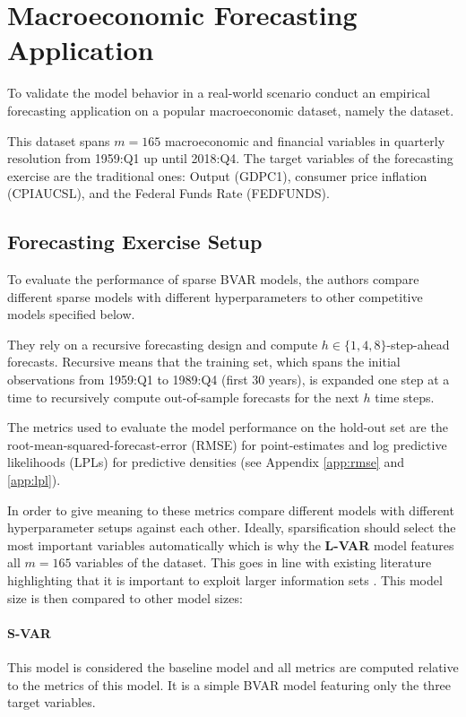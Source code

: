 \section{Macroeconomic Forecasting Application}
\label{sec:forecasting_application}
To validate the model behavior in a real-world scenario \textcite{hauzenberger_combining_2021} conduct an empirical forecasting application on a popular macroeconomic dataset, namely the \textcite{mccracken_fred-md_2015} dataset.

This dataset spans $m = 165$ macroeconomic and financial variables in quarterly resolution from 1959:Q1 up until 2018:Q4. The target variables of the forecasting exercise are the traditional ones: Output (GDPC1), consumer price inflation (CPIAUCSL), and the Federal Funds Rate (FEDFUNDS).

\subsection{Forecasting Exercise Setup}
\label{subsec:forecasting_setup}
To evaluate the performance of sparse BVAR models, the authors compare different sparse models with different hyperparameters to other competitive models specified below.

They rely on a recursive forecasting design and compute $h \in \{1,4,8\}$-step-ahead forecasts. Recursive means that the training set, which spans the initial observations from 1959:Q1 to 1989:Q4 (first 30 years), is expanded one step at a time to recursively compute out-of-sample forecasts for the next $h$ time steps.

The metrics used to evaluate the model performance on the hold-out set are the root-mean-squared-forecast-error (RMSE) for point-estimates and log predictive likelihoods (LPLs) for predictive densities (see Appendix \ref{app:rmse} and \ref{app:lpl}).

In order to give meaning to these metrics \textcite{hauzenberger_combining_2021} compare different models with different hyperparameter setups against each other. Ideally, sparsification should select the most important variables automatically which is why the \textbf{L-VAR} model features all $m = 165$ variables of the dataset. This goes in line with existing literature highlighting that it is important to exploit larger information sets \parencite{banbura_large_2010,giannone_prior_2015,koop_forecasting_2013}. This model size is then compared to other model sizes:

\paragraph{S-VAR} This model is considered the baseline model and all metrics are computed relative to the metrics of this model. It is a simple BVAR model featuring only the three target variables.

